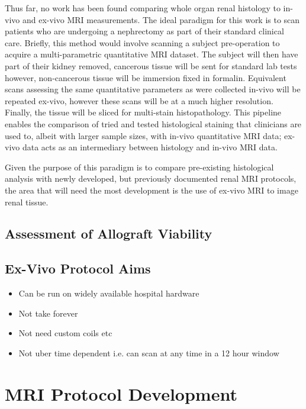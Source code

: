 Thus far, no work has been found comparing whole organ renal histology to in-vivo and ex-vivo \ac{MRI} measurements. The ideal paradigm for this work is to scan patients who are undergoing a nephrectomy as part of their standard clinical care. Briefly, this method would involve scanning a subject pre-operation to acquire a multi-parametric quantitative \ac{MRI} dataset. The subject will then have part of their kidney removed, cancerous tissue will be sent for standard lab tests however, non-cancerous tissue will be immersion fixed in formalin. Equivalent scans assessing the same quantitative parameters as were collected in-vivo will be repeated ex-vivo, however these scans will be at a much higher resolution. Finally, the tissue will be sliced for multi-stain histopathology. This pipeline enables the comparison of tried and tested histological staining that clinicians are used to, albeit with larger sample sizes, with in-vivo quantitative \ac{MRI} data; ex-vivo data acts as an intermediary between histology and in-vivo \ac{MRI} data.

Given the purpose of this paradigm is to compare pre-existing histological analysis with newly developed, but previously documented renal \ac{MRI} protocols, the area that will need the most development is the use of ex-vivo \ac{MRI} to image renal tissue.

\subsection{Assessment of Allograft Viability}

\subsection{Ex-Vivo Protocol Aims}
\begin{itemize}
	\item Can be run on widely available hospital hardware
	\item Not take forever
	\item Not need custom coils etc
	\item Not uber time dependent i.e. can scan at any time in a 12 hour window
\end{itemize}

\section{MRI Protocol Development}

